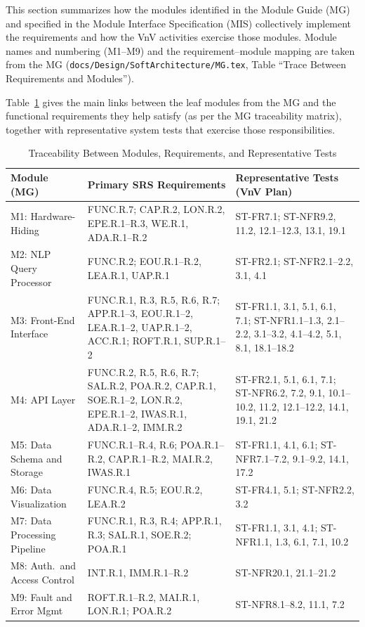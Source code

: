 \documentclass[12pt, titlepage]{article}
\begin{document}
This section summarizes how the modules identified in the Module Guide (MG) and
specified in the Module Interface Specification (MIS) collectively implement
the requirements and how the VnV activities exercise those modules.  Module
names and numbering (M1--M9) and the requirement--module mapping are taken from the MG
(\texttt{docs/Design/SoftArchitecture/MG.tex}, Table ``Trace Between Requirements and Modules'').

Table~\ref{TblTraceModulesToReq} gives the main links between the leaf modules
from the MG and the functional requirements they help satisfy (as per the MG
traceability matrix), together with representative system tests that exercise
those responsibilities.

\begin{table}[h!]
  \centering
  \caption{Traceability Between Modules, Requirements, and Representative Tests}
  \label{TblTraceModulesToReq}
  \renewcommand{\arraystretch}{1.2}
  \footnotesize
  \begin{tabular}{@{}p{2.2cm}>{\RaggedRight\arraybackslash}p{5.4cm}>{\RaggedRight\arraybackslash}p{4.2cm}@{}}
    \toprule
    \textbf{Module (MG)} & \textbf{Primary SRS Requirements} & \textbf{Representative Tests (VnV Plan)} \\
    \midrule
    M1: Hardware-Hiding & FUNC.R.7; CAP.R.2, LON.R.2, EPE.R.1--R.3, WE.R.1, ADA.R.1--R.2 & ST-FR7.1; ST-NFR9.2, 11.2, 12.1--12.3, 13.1, 19.1 \\
    \midrule
    M2: NLP Query Processor & FUNC.R.2; EOU.R.1--R.2, LEA.R.1, UAP.R.1 & ST-FR2.1; ST-NFR2.1--2.2, 3.1, 4.1 \\
    \midrule
    M3: Front-End Interface & FUNC.R.1, R.3, R.5, R.6, R.7; APP.R.1--3, EOU.R.1--2, LEA.R.1--2, UAP.R.1--2, ACC.R.1; ROFT.R.1, SUP.R.1--2 & ST-FR1.1, 3.1, 5.1, 6.1, 7.1; ST-NFR1.1--1.3, 2.1--2.2, 3.1--3.2, 4.1--4.2, 5.1, 8.1, 18.1--18.2 \\
    \midrule
    M4: API Layer & FUNC.R.2, R.5, R.6, R.7; SAL.R.2, POA.R.2, CAP.R.1, SOE.R.1--2, LON.R.2, EPE.R.1--2, IWAS.R.1, ADA.R.1--2, IMM.R.2 & ST-FR2.1, 5.1, 6.1, 7.1; ST-NFR6.2, 7.2, 9.1, 10.1--10.2, 11.2, 12.1--12.2, 14.1, 19.1, 21.2 \\
    \midrule
    M5: Data Schema and Storage & FUNC.R.1--R.4, R.6; POA.R.1--R.2, CAP.R.1--R.2, MAI.R.2, IWAS.R.1 & ST-FR1.1, 4.1, 6.1; ST-NFR7.1--7.2, 9.1--9.2, 14.1, 17.2 \\
    \midrule
    M6: Data Visualization & FUNC.R.4, R.5; EOU.R.2, LEA.R.2 & ST-FR4.1, 5.1; ST-NFR2.2, 3.2 \\
    \midrule
    M7: Data Processing Pipeline & FUNC.R.1, R.3, R.4; APP.R.1, R.3; SAL.R.1, SOE.R.2; POA.R.1 & ST-FR1.1, 3.1, 4.1; ST-NFR1.1, 1.3, 6.1, 7.1, 10.2 \\
    \midrule
    M8: Auth.\ and Access Control & INT.R.1, IMM.R.1--R.2 & ST-NFR20.1, 21.1--21.2 \\
    \midrule
    M9: Fault and Error Mgmt & ROFT.R.1--R.2, MAI.R.1, LON.R.1; POA.R.2 & ST-NFR8.1--8.2, 11.1, 7.2 \\
    \bottomrule
  \end{tabular}
\end{table}
\end{document}
